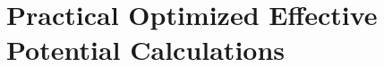 \documentclass{article}
\newcommand{\beas}{\begin{eqnarray*}}
\newcommand{\enas}{\end{eqnarray*}}
\newcommand{\bea}{\begin{eqnarray}} \newcommand{\ena}{\end{eqnarray}}
\newcommand{\q}{k} \newcommand{\proof}{ {\bf Proof:} }
\def\squarebox#1{\hbox to #1{\hfill\vbox to #1{\vfill}}}
\newcommand{\qed}{\hfill\hfill\vbox{\hrule\hbox{\vrule\squarebox
{.667em}\vrule}\hrule}\smallskip} \newcommand{\level}{\mbox{$\theta$}}
\newcommand{\vspan}{\mbox{span}} \newcommand{\supp}{\mbox{supp}}
\newcommand{\trace}{\mbox{tr}} \newcommand{\real}{\mathcal Re}
\newcommand{\imag}{\mathcal Im} \newcommand{\diag}{\mbox{diag}}
\newcommand{\offd}{\mbox{off}} \newcommand{\low}{\mbox{low}}
\newcommand{\half}{{\frac{1}{2}}} \newcommand{\quarter}{{\frac{1}{4}}}
\newcommand{\eighth}{{\frac{1}{8}}} \newcommand{\Det}{\mbox{det}}
\newcommand{\Vscp}{V}
\newcommand{\rank}{\mbox{rank}}
\newcommand{\eig}{\mbox{{\bf eig}}}
\newcommand{\vect}{\mbox{vec}}
\newcommand{\integers}{\mbox{Z}}
\newcommand{\field}{\mathbb{F}}
\newcommand{\reals}{\mathbb{R}}
\newcommand{\complexes}{\mathbb{C}}
\newcommand{\nullspace}{Null}
\newcommand{\Rl}{\mathbb{R}}
\newcommand{\Nl}{\mathbb{N}}
\newcommand{\Ir}{\mathbb{Z}}
\newcommand{\Cx}{\mathbb{C}}
\newcommand{\A}{\mathcal{A}}
\newcommand{\HH}{\mathcal{H}}
\newcommand{\LL}{\mbox{ad}}
\newcommand{\KK}{\mathcal{K}}
\newcommand{\N}{\mathcal{N}}
\newcommand{\Proj}{{\rm Proj}}
\newcommand{\Span}{{\rm span}}
\newcommand{\abs}[1]{\lvert#1\rvert}
\newcommand{\floor}[1]{\left\lfloor{#1}\right\rfloor}
\newcommand{\ceil}[1]{\left\lceil{#1}\right\rceil}
\newcommand{\ket}[1]{\lvert#1\rangle}
\begin{document}
%
%
%
%

\section{Practical Optimized Effective Potential Calculations}
\end{document}
